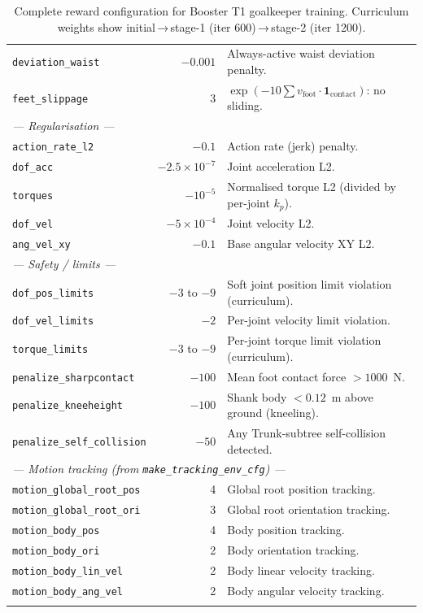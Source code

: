 \documentclass[11pt,a4paper]{article}
\begin{document}
\begin{longtable}{p{3.5cm} r p{8.0cm}}
\texttt{deviation\_waist}   & $-0.001$ & Always-active waist deviation penalty. \\[4pt]
\texttt{feet\_slippage}     & 3 & $\exp(-10 \sum v_\text{foot} \cdot \mathbf{1}_\text{contact})$: no sliding. \\[4pt]
\midrule
\multicolumn{3}{l}{\textit{--- Regularisation ---}} \\[2pt]
\texttt{action\_rate\_l2}   & $-0.1$ & Action rate (jerk) penalty. \\[4pt]
\texttt{dof\_acc}           & $-2.5\times10^{-7}$ & Joint acceleration L2. \\[4pt]
\texttt{torques}            & $-10^{-5}$ & Normalised torque L2 (divided by per-joint $k_p$). \\[4pt]
\texttt{dof\_vel}           & $-5\times10^{-4}$ & Joint velocity L2. \\[4pt]
\texttt{ang\_vel\_xy}       & $-0.1$ & Base angular velocity XY L2. \\[4pt]
\midrule
\multicolumn{3}{l}{\textit{--- Safety / limits ---}} \\[2pt]
\texttt{dof\_pos\_limits}   & $-3$ to $-9$ & Soft joint position limit violation (curriculum). \\[4pt]
\texttt{dof\_vel\_limits}   & $-2$ & Per-joint velocity limit violation. \\[4pt]
\texttt{torque\_limits}     & $-3$ to $-9$ & Per-joint torque limit violation (curriculum). \\[4pt]
\texttt{penalize\_sharpcontact} & $-100$ & Mean foot contact force $> 1000$~N. \\[4pt]
\texttt{penalize\_kneeheight}   & $-100$ & Shank body $< 0.12$~m above ground (kneeling). \\[4pt]
\texttt{penalize\_self\_collision} & $-50$ & Any Trunk-subtree self-collision detected. \\[4pt]
\midrule
\multicolumn{3}{l}{\textit{--- Motion tracking (from \texttt{make\_tracking\_env\_cfg}) ---}} \\[2pt]
\texttt{motion\_global\_root\_pos} & 4 & Global root position tracking. \\[4pt]
\texttt{motion\_global\_root\_ori} & 3 & Global root orientation tracking. \\[4pt]
\texttt{motion\_body\_pos}  & 4 & Body position tracking. \\[4pt]
\texttt{motion\_body\_ori}  & 2 & Body orientation tracking. \\[4pt]
\texttt{motion\_body\_lin\_vel} & 2 & Body linear velocity tracking. \\[4pt]
\texttt{motion\_body\_ang\_vel} & 2 & Body angular velocity tracking. \\[4pt]
\bottomrule
\caption{Complete reward configuration for Booster T1 goalkeeper training.
  Curriculum weights show initial\,→\,stage-1 (iter 600)\,→\,stage-2 (iter 1200).}
\end{longtable}
\end{document}
